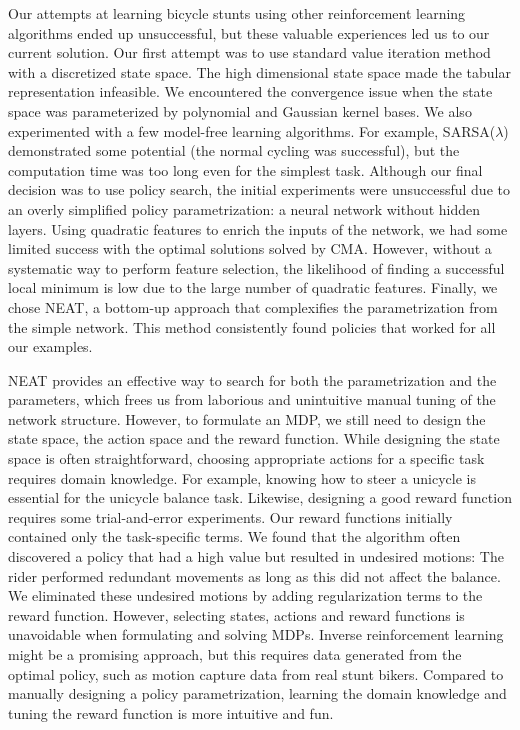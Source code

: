 Our attempts at learning bicycle stunts using other reinforcement learning algorithms ended up unsuccessful, but these valuable experiences led us to our current solution. Our first attempt was to use standard value iteration method with a discretized state space. The high dimensional state space made the tabular representation infeasible. We encountered the convergence issue when the state space was parameterized by polynomial and Gaussian kernel bases. We also experimented with a few model-free learning algorithms. For example, SARSA($\lambda$) demonstrated some potential (\ie the normal cycling was successful), but the computation time was too long even for the simplest task. Although our final decision was to use policy search, the initial experiments were unsuccessful due to an overly simplified policy parametrization: a neural network without hidden layers. Using quadratic features to enrich the inputs of the network, we had some limited success with the optimal solutions solved by CMA. However, without a systematic way to perform feature selection, the likelihood of finding a successful local minimum is low due to the large number of quadratic features. Finally, we chose NEAT, a bottom-up approach that complexifies the parametrization from the simple network. This method consistently found policies that worked for all our examples.

NEAT provides an effective way to search for both the parametrization and the parameters, which frees us from laborious and unintuitive manual tuning of the network structure. However, to formulate an MDP, we still need to design the state space, the action space and the reward function. While designing the state space is often straightforward, choosing appropriate actions for a specific task requires domain knowledge. For example, knowing how to steer a unicycle is essential for the unicycle balance task. Likewise, designing a good reward function requires some trial-and-error experiments. Our reward functions initially contained only the task-specific terms. We found that the algorithm often discovered a policy that had a high value but resulted in undesired motions: The rider performed redundant movements as long as this did not affect the balance. We eliminated these undesired motions by adding regularization terms to the reward function. However, selecting states, actions and reward functions is unavoidable when formulating and solving MDPs. Inverse reinforcement learning \cite{Ng:2000} might be a promising approach, but this requires data generated from the optimal policy, such as motion capture data from real stunt bikers. Compared to manually designing a policy parametrization, learning the domain knowledge and tuning the reward function is more intuitive and fun.

